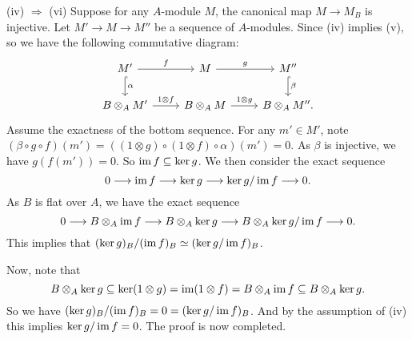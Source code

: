 \documentclass[../A&M.tex]{subfiles}
\begin{document}
(iv) $\Rightarrow$ (vi) Suppose for any $A$-module $M$, the canonical map $M \to M_B$ is injective. Let $M' \to M \to M''$ be a sequence of $A$-modules. Since (iv) implies (v), so we have the following commutative diagram:
$$
\begin{tikzcd}
M' \arrow[r, "f"] \arrow[d, hook, "\alpha"] & M \arrow[r, "g"] & M'' \arrow[d, hook, "\beta"] \\ 
B \otimes_A M' \arrow[r, "1\otimes f"] & B \otimes_A M \arrow[r, "1\otimes g"] & B \otimes_A M''.
\end{tikzcd}
$$
Assume the exactness of the bottom sequence. For any $m' \in M'$, note $(\beta \circ g \circ f)(m') = ((1\otimes g) \circ (1\otimes f) \circ \alpha)(m') = 0$. As $\beta$ is injective, we have $g(f(m')) = 0$. So $\operatorname{im} f \subseteq \ker g$. We then consider the exact sequence
$$
0 \longrightarrow \operatorname{im} f \longrightarrow \ker g \longrightarrow \ker g/\operatorname{im} f \longrightarrow 0.
$$
As $B$ is flat over $A$, we have the exact sequence
$$
0 \longrightarrow B \otimes_A \operatorname{im} f \longrightarrow B \otimes_A \ker g \longrightarrow B \otimes_A \ker g/\operatorname{im} f \longrightarrow 0.
$$
This implies that $(\ker g)_B/(\operatorname{im} f)_B \simeq (\ker g/\operatorname{im} f)_B$.

Now, note that
$$
B \otimes_A \ker g \subseteq \ker(1\otimes g) = \operatorname{im}(1\otimes f) = B \otimes_A \operatorname{im} f \subseteq B \otimes_A \ker g.
$$
So we have $(\ker g)_B/(\operatorname{im} f)_B = 0 = (\ker g/\operatorname{im} f)_B$. And by the assumption of (iv) this implies $\ker g/\operatorname{im} f = 0$. The proof is now completed.
\end{document}

